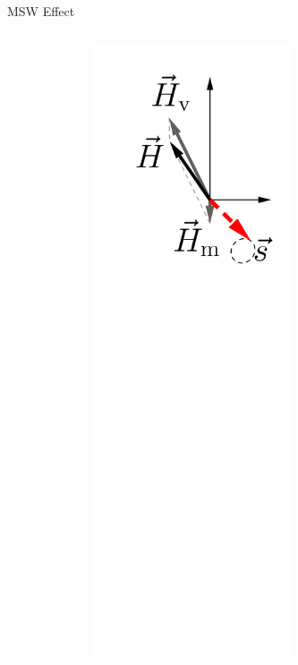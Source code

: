 \documentclass[9pt]{beamer}
\begin{document}
\begin{darkframes}
\begin{frame}{MSW Effect}
{\begin{columns}[T]
\begin{column}{0.33\textwidth}
\end{column}
\begin{column}{0.33\textwidth}



\begin{figure}
    \centering
    \colorbox{white}{\includegraphics[width=0.6\textwidth]{assets/matter-effect-adiabatic-3}}
\end{figure}




\end{column}
\end{columns}}
\end{frame}
\end{darkframes}
\end{document}
